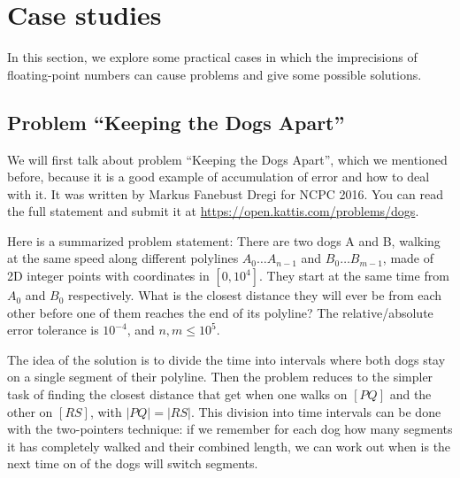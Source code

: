 \section{Case studies}\label{s:case-studies}
In this section, we explore some practical cases in which the imprecisions of floating-point numbers can cause problems and give some possible solutions.

\subsection{Problem ``Keeping the Dogs Apart''}\label{ss:dogs}
We will first talk about problem ``Keeping the Dogs Apart'', which we mentioned before, because it is a good example of accumulation of error and how to deal with it. It was written by Markus Fanebust Dregi for NCPC 2016. You can read the full statement and submit it at \url{https://open.kattis.com/problems/dogs}.

Here is a summarized problem statement: There are two dogs A and B, walking at the same speed along different polylines $A_0 \ldots A_{n-1}$ and $B_0 \ldots B_{m-1}$, made of 2D integer points with coordinates in $[0,10^4]$. They start at the same time from $A_0$ and $B_0$ respectively. What is the closest distance they will ever be from each other before one of them reaches the end of its polyline? The relative/absolute error tolerance is $10^{-4}$, and $n,m \leq 10^5$.

The idea of the solution is to divide the time into intervals where both dogs stay on a single segment of their polyline. Then the problem reduces to the simpler task of finding the closest distance that get when one walks on $[PQ]$ and the other on $[RS]$, with $|PQ|=|RS|$. This division into time intervals can be done with the two-pointers technique: if we remember for each dog how many segments it has completely walked and their combined length, we can work out when is the next time on of the dogs will switch segments.

